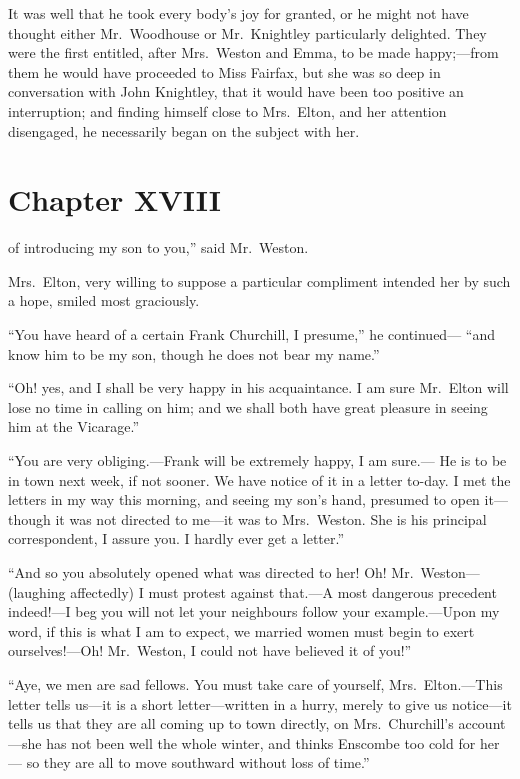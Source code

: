 It was well that he took every body's joy for granted, or he
might not have thought either Mr.\ Woodhouse or Mr.\ Knightley
particularly delighted.  They were the first entitled,
after Mrs.\ Weston and Emma, to be made happy;---from them he would
have proceeded to Miss Fairfax, but she was so deep in conversation
with John Knightley, that it would have been too positive
an interruption; and finding himself close to Mrs.\ Elton, and
her attention disengaged, he necessarily began on the subject with her.



\chapter{Chapter XVIII}


 of introducing my son to you,''
said Mr.\ Weston.

Mrs.\ Elton, very willing to suppose a particular compliment intended
her by such a hope, smiled most graciously.

``You have heard of a certain Frank Churchill, I presume,'' he continued---%
``and know him to be my son, though he does not bear my name.''

``Oh! yes, and I shall be very happy in his acquaintance.
I am sure Mr.\ Elton will lose no time in calling on him; and we
shall both have great pleasure in seeing him at the Vicarage.''

``You are very obliging.---Frank will be extremely happy, I am sure.---%
He is to be in town next week, if not sooner.  We have notice of it
in a letter to-day. I met the letters in my way this morning,
and seeing my son's hand, presumed to open it---though it was not directed
to me---it was to Mrs.\ Weston.  She is his principal correspondent,
I assure you.  I hardly ever get a letter.''

``And so you absolutely opened what was directed to her!  Oh!  Mr.\ Weston---%
(laughing affectedly) I must protest against that.---A most dangerous
precedent indeed!---I beg you will not let your neighbours follow
your example.---Upon my word, if this is what I am to expect,
we married women must begin to exert ourselves!---Oh!  Mr.\ Weston,
I could not have believed it of you!''

``Aye, we men are sad fellows.  You must take care of yourself,
Mrs.\ Elton.---This letter tells us---it is a short letter---written in
a hurry, merely to give us notice---it tells us that they are all
coming up to town directly, on Mrs.\ Churchill's account---she has
not been well the whole winter, and thinks Enscombe too cold for her---%
so they are all to move southward without loss of time.''

